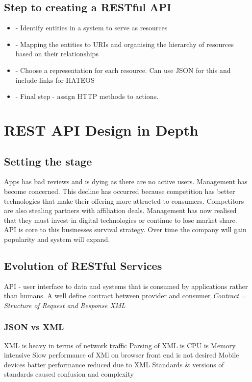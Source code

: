 \subsection{Step to creating a RESTful API}
\begin{itemize}
    \item - Identify entities in a system to serve as resources
    \item - Mapping the entities to URIs and organising the hierarchy of resources based on their relationships
    \item - Choose a representation for each resource. Can use JSON for this and include links for HATEOS
    \item - Final step - assign HTTP methods to actions.
\end{itemize}


\section{REST API Design in Depth}

\subsection{Setting the stage}
Apps has bad reviews and is dying as there are no active users.
Management has become concerned.
This decline has occurred because competition has better technologies that make their offering more attracted to consumers.
Competitors are also stealing partners with affiliation deals.
Management has now realised that they must invest in digital technologies or continue to lose market share.
API is core to this businesses survival strategy.
Over time the company will gain popularity and system will expand.

\subsection{Evolution of RESTful Services}
API - user interface to data and systems that is consumed by applications rather than humans.
A well define contract between provider and consumer
\textit{Contract = Structure of Request and Response XML}

\subsubsection{JSON vs XML}
XML is heavy in terms of network traffic
Parsing of XML is CPU is Memory intensive
Slow performance of XMl on browser front end is not desired
Mobile devices batter performance reduced due to XML
Standards \& versions of standards caused confusion and complexity


